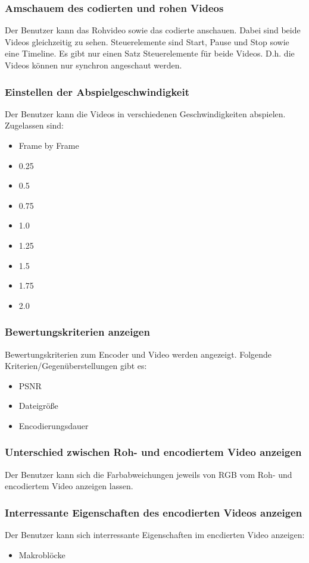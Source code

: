 \documentclass[parskip=full]{scrartcl}
\begin{document}
\subsubsection{Amschauem des codierten und rohen Videos}
Der Benutzer kann das Rohvideo sowie das codierte anschauen. Dabei sind beide Videos gleichzeitig zu sehen. Steuerelemente sind Start, Pause und Stop sowie eine Timeline. Es gibt nur einen Satz Steuerelemente für beide Videos. D.h. die Videos können nur synchron angeschaut werden.
\subsubsection{Einstellen der Abspielgeschwindigkeit}
Der Benutzer kann die Videos in verschiedenen Geschwindigkeiten abspielen. Zugelassen sind:
\begin{itemize}
\item Frame by Frame
\item 0.25
\item 0.5
\item 0.75
\item 1.0
\item 1.25
\item 1.5
\item 1.75
\item 2.0
\end{itemize}
\subsubsection{Bewertungskriterien anzeigen}
Bewertungskriterien zum Encoder und Video werden angezeigt. Folgende Kriterien/Gegenüberstellungen gibt es:
\begin{itemize}
\item PSNR
\item Dateigröße
\item Encodierungsdauer
\end{itemize}
\subsubsection{Unterschied zwischen Roh- und encodiertem Video anzeigen}
Der Benutzer kann sich die Farbabweichungen jeweils von RGB vom Roh- und encodiertem Video anzeigen lassen.
\subsubsection{Interressante Eigenschaften des encodierten Videos anzeigen}
Der Benutzer kann sich interressante Eigenschaften im encdierten Video anzeigen:
\begin{itemize}
\item Makroblöcke
\end{itemize}
\newpage
\end{document}
